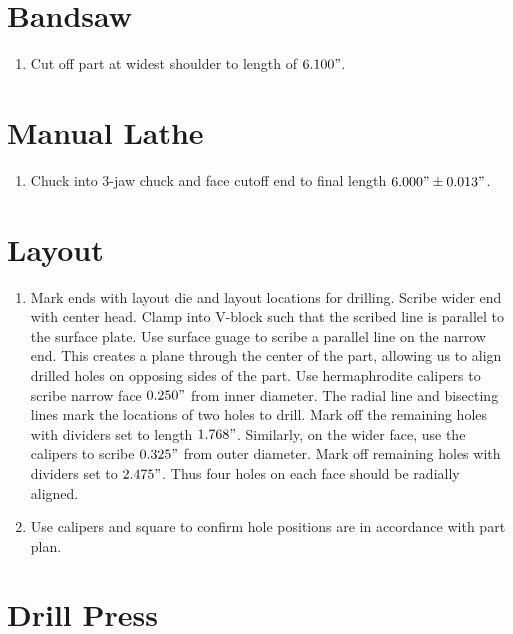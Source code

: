 \documentclass{article}
\begin{document}
\section*{Bandsaw}

\begin{enumerate}[resume]
	\item Cut off part at widest shoulder to length of $6.100"$.
\end{enumerate}

\section*{Manual Lathe}

\begin{enumerate}[resume]
	\item Chuck into 3-jaw chuck and face cutoff end to final length $6.000" \pm 0.013"$.
\end{enumerate}

\section*{Layout}

\begin{enumerate}[resume]
	\item Mark ends with layout die and layout locations for drilling.  Scribe wider end with center head.  Clamp into V-block such that the scribed line is parallel to the surface plate.  Use surface guage to scribe a parallel line on the narrow end.  This creates a plane through the center of the part, allowing us to align drilled holes on opposing sides of the part.  Use hermaphrodite calipers to scribe narrow face $0.250"$ from inner diameter.  The radial line and bisecting lines mark the locations of two holes to drill.  Mark off the remaining holes with dividers set to length $1.768"$.  Similarly, on the wider face, use the calipers to scribe $0.325"$ from outer diameter.  Mark off remaining holes with dividers set to $2.475"$.  Thus four holes on each face should be radially aligned.

	\item Use calipers and square to confirm hole positions are in accordance with part plan.
\end{enumerate}

\section*{Drill Press}
\end{document}

